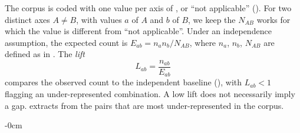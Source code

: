 \documentclass[mathematics,review,submit,moreauthors]{Definitions/mdpi}
\begin{document}
The corpus is coded with one value per axis of , or ``not applicable'' ().
For two distinct axes $A\neq B$, with values $a$ of $A$ and $b$ of $B$, we keep the $N_{AB}$ works for which the value is different from ``not applicable''.
Under an independence assumption, the expected count is $E_{ab}=n_a n_b/N_{AB}$, where $n_a$, $n_b$, $N_{AB}$ are defined as in .
The \emph{lift}
\begin{equation}
    L_{ab}=\frac{n_{ab}}{E_{ab}}
\end{equation}
compares the observed count to the independent baseline (), with $L_{ab}<1$ flagging an under-represented combination.
A low lift does not necessarily imply a gap.
 extracts from  the pairs that are most under-represented in the corpus.


% 
\newpage

\newpage

\begin{adjustwidth}{-\extralength}{0cm}



\PublishersNote{}
\end{adjustwidth}
\end{document}
